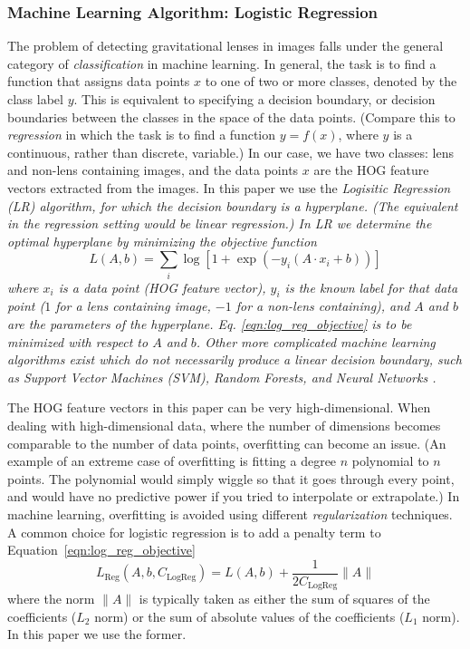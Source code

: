 \documentclass{emulateapj}
\begin{document}
\subsubsection{Machine Learning Algorithm: Logistic Regression}\label{sec:LR}
The problem of detecting gravitational lenses in images falls under
the general category of {\em{classification}} in machine learning. In
general, the task is to find a function that assigns data points $x$ to
one of two or more classes, denoted by the class label $y$.  This is
equivalent to specifying a decision boundary, or decision boundaries
between the classes in the space of the data points.  (Compare this to
{\em{regression}} in which the task is to find a function $y=f(x)$,
where $y$ is a continuous, rather than discrete, variable.) In our
case, we have two classes: lens and non-lens containing images, and
the data points $x$ are the HOG feature vectors extracted from the
images.  In this paper we use the \em{Logisitic Regression}
(LR) algorithm, for which the decision boundary is a hyperplane.  (The
equivalent in the regression setting would be linear regression.) In
LR we determine the optimal hyperplane by minimizing the objective
function
\begin{equation}
\label{eqn:log_reg_objective}
L(A,b) = \sum_i \log \left[1 + \exp \left(-y_i (A \cdot x_i + b) \right) \right]
\end{equation}
where $x_i$ is a data point (HOG feature vector), $y_i$ is the
known label for that data point ($1$ for a lens containing
image, $-1$ for a non-lens containing), and $A$ and $b$ are
the parameters of the hyperplane. Eq. \ref{eqn:log_reg_objective}
is to be minimized with respect to $A$ and $b$.
Other more complicated machine learning algorithms exist which
do not necessarily produce a linear decision boundary, such as
\em{Support Vector Machines} (SVM), \em{Random Forests}, and
\em{Neural Networks} \citep{hastie_09}.

The HOG feature vectors in this paper can be very high-dimensional.
When dealing with high-dimensional data, where the number of
dimensions becomes comparable to the number of data points,
overfitting can become an issue. (An example of an extreme case
of overfitting is fitting a degree $n$ polynomial to $n$
points.  The polynomial would simply wiggle so that it goes
through every point, and would have no predictive power if you
tried to interpolate or extrapolate.) In machine learning,
overfitting is avoided using different {\em{regularization}}
techniques. A common choice for logistic regression is to
add a penalty term to Equation~\ref{eqn:log_reg_objective}
\begin{equation}\label{eqn:log_reg_regularized}
L_\text{Reg}(A,b,C_\text{LogReg}) = L(A,b) + \frac{1}{2C_\text{LogReg}} \|A\|
\end{equation}
where the norm $\|A\|$ is typically taken as either the
sum of squares of the coefficients ($L_2$ norm) or the sum
of absolute values of the coefficients ($L_1$ norm).  In this
paper we use the former.
\end{document}
